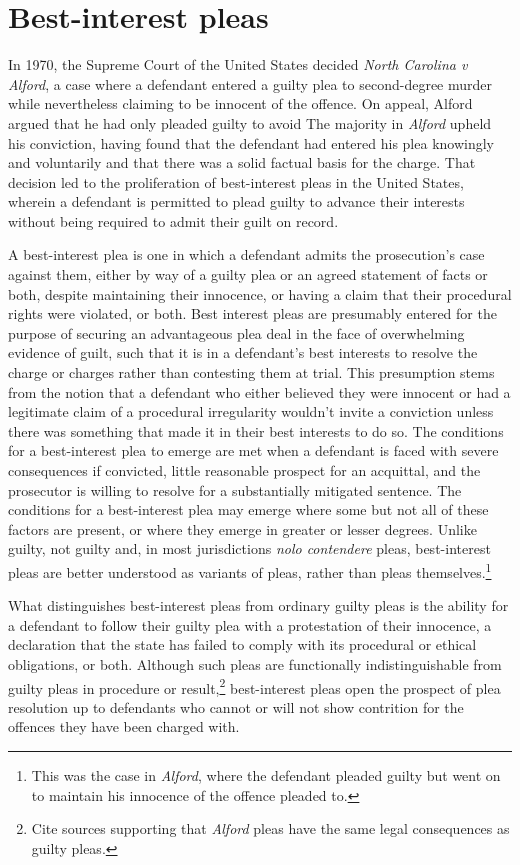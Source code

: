 \section{Best-interest pleas}

In 1970, the Supreme Court of the United States decided \textit{North Carolina v Alford}, a case where a defendant entered a guilty plea to second-degree murder while nevertheless claiming to be innocent of the offence. On appeal, Alford argued that he had only pleaded guilty to avoid The majority in \textit{Alford} upheld his conviction, having found that the defendant had entered his plea knowingly and voluntarily and that there was a solid factual basis for the charge. That decision led to the proliferation of best-interest pleas in the United States, wherein a defendant is permitted to plead guilty to advance their interests without being required to admit their guilt on record.

A best-interest plea is one in which a defendant admits the prosecution’s case against them, either by way of a guilty plea or an agreed statement of facts or both, despite maintaining their innocence, or having a claim that their procedural rights were violated, or both. Best interest pleas are presumably entered for the purpose of securing an advantageous plea deal in the face of overwhelming evidence of guilt, such that it is in a defendant’s best interests to resolve the charge or charges rather than contesting them at trial. This presumption stems from the notion that a defendant who either believed they were innocent or had a legitimate claim of a procedural irregularity wouldn't invite a conviction unless there was something that made it in their best interests to do so. The conditions for a best-interest plea to emerge are met when a defendant is faced with severe consequences if convicted, little reasonable prospect for an acquittal, and the prosecutor is willing to resolve for a substantially mitigated sentence. The conditions for a best-interest plea may emerge where some but not all of these factors are present, or where they emerge in greater or lesser degrees. Unlike guilty, not guilty and, in most jurisdictions \textit{nolo contendere} pleas, best-interest pleas are better understood as variants of pleas, rather than pleas themselves.\footnote{This was the case in \textit{Alford}, where the defendant pleaded guilty but went on to maintain his innocence of the offence pleaded to.}

What distinguishes best-interest pleas from ordinary guilty pleas is the ability for a defendant to follow their guilty plea with a protestation of their innocence, a declaration that the state has failed to comply with its procedural or ethical obligations, or both. Although such pleas are functionally indistinguishable from guilty pleas in procedure or result,\footnote{Cite sources supporting that \textit{Alford} pleas have the same legal consequences as guilty pleas.} best-interest pleas open the prospect of plea resolution up to defendants who cannot or will not show contrition for the offences they have been charged with.

